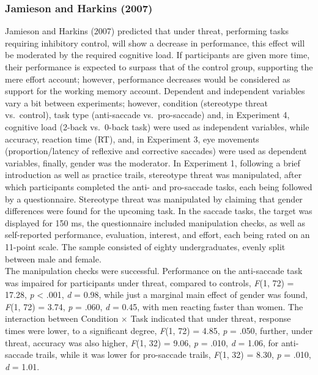\documentclass[
  stu,floatsintext]{apa7}
\begin{document}
\subsubsection{Jamieson and Harkins (2007)}\label{jamiesonmereeffortstereotype2007}

Jamieson and Harkins (2007) predicted that under threat, performing tasks requiring inhibitory control, will show a decrease in performance, this effect will be moderated by the required cognitive load.
If participants are given more time, their performance is expected to surpass that of the control group, supporting the mere effort account; however, performance decreases would be considered as support for the working memory account.
Dependent and independent variables vary a bit between experiments; however, condition (stereotype threat vs.~control), task type (anti-saccade vs.~pro-saccade) and, in Experiment 4, cognitive load (2-back vs.~0-back task) were used as independent variables, while accuracy, reaction time (RT), and, in Experiment 3, eye movements (proportion/latency of reflexive and corrective saccades) were used as dependent variables, finally, gender was the moderator.
In Experiment 1, following a brief introduction as well as practice trails, stereotype threat was manipulated, after which participants completed the anti- and pro-saccade tasks, each being followed by a questionnaire.
Stereotype threat was manipulated by claiming that gender differences were found for the upcoming task.
In the saccade tasks, the target was displayed for 150 ms, the questionnaire included manipulation checks, as well as self-reported performance, evaluation, interest, and effort, each being rated on an 11-point scale.
The sample consisted of eighty undergraduates, evenly split between male and female.\\
The manipulation checks were successful.
Performance on the anti-saccade task was impaired for participants under threat, compared to controls, \emph{F}(1, 72) = 17.28, \emph{p} \textless{} .001, \emph{d} = 0.98, while just a marginal main effect of gender was found, \emph{F}(1, 72) = 3.74, \emph{p} = .060, \emph{d} = 0.45, with men reacting faster than women.
The interaction between Condition \(\times\) Task indicated that under threat, response times were lower, to a significant degree, \emph{F}(1, 72) = 4.85, \emph{p} = .050, further, under threat, accuracy was also higher, \emph{F}(1, 32) = 9.06, \emph{p} = .010, \emph{d} = 1.06, for anti-saccade trails, while it was lower for pro-saccade trails, \emph{F}(1, 32) = 8.30, \emph{p} = .010, \emph{d} = 1.01.\\
\end{document}
